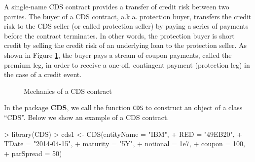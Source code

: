 \documentclass[a4paper]{article}
\begin{document}

A single-name CDS contract provides a transfer of credit risk between
two parties. The buyer of a CDS contract, a.k.a. protection buyer,
transfers the credit risk to the CDS seller (or called protection
seller) by paying a series of payments before the contract
terminates. In other words, the protection buyer is short credit by
selling the credit risk of an underlying loan to the protection
seller. As shown in Figure \ref{fig:cashFlow}, the buyer pays a stream
of coupon payments, called the premium leg, in order to receive a
one-off, contingent payment (protection leg) in the case of a credit
event.\\


\begin{figure}
  \caption{\label{fig:cashFlow} Mechanics of a CDS contract}
\begin{center}
\end{center}
\end{figure}

In the package \textbf{CDS}, we call the function \texttt{CDS} to construct an object of a class ``CDS''. Below we show an example of a CDS contract.


\begin{Schunk}
\begin{Sinput}
> library(CDS)
> cds1 <- CDS(entityName = "IBM",
+             RED = "49EB20",
+             TDate = "2014-04-15",
+             maturity = "5Y",
+             notional = 1e7,
+             coupon = 100,
+             parSpread = 50)
\end{Sinput}
\end{Schunk}
\end{document}
